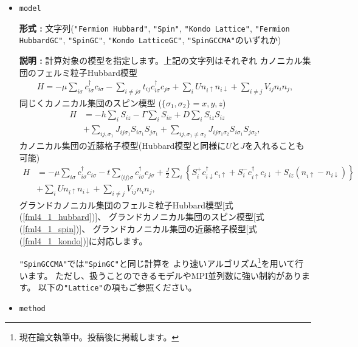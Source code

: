 \begin{itemize}

\item \verb|model|

{\bf 形式 :} 文字列(\verb|"Fermion Hubbard"|, \verb|"Spin"|, \verb|"Kondo Lattice"|, 
\verb|"Fermion HubbardGC"|, \verb|"SpinGC"|, \verb|"Kondo LatticeGC"|, 
\verb|"SpinGCCMA"|のいずれか)

{\bf 説明 :} 計算対象の模型を指定します。上記の文字列はそれぞれ
カノニカル集団のフェルミ粒子Hubbard模型
\begin{align}
H = - \mu \sum_{i \sigma} c^\dagger_{i \sigma} c_{i \sigma} 
- \sum_{i \neq j \sigma} t_{i j} c^\dagger_{i \sigma} c_{j \sigma} 
+ \sum_{i} U n_{i \uparrow} n_{i \downarrow}
+ \sum_{i \neq j} V_{i j} n_{i} n_{j},
\label{fml4_1_hubbard}
\end{align}
同じくカノニカル集団のスピン模型 ($\{\sigma_1, \sigma_2\}={x, y, z}$)
\begin{align}
H &= -h \sum_{i} S_{i z} - \Gamma \sum_{i} S_{i x} + D \sum_{i} S_{i z} S_{i z}
\nonumber \\
&+ \sum_{i j, \sigma_1}J_{i j \sigma_1} S_{i \sigma_1} S_{j \sigma_1}+ \sum_{i j, \sigma_1 \neq \sigma_2} J_{i j \sigma_1 \sigma_2} S_{i \sigma_1} S_{j \sigma_2} ,
\label{fml4_1_spin}
\end{align}
カノニカル集団の近藤格子模型(Hubbard模型と同様に$U$と$J$を入れることも可能)
\begin{align}
H &= - \mu \sum_{i \sigma} c^\dagger_{i \sigma} c_{i \sigma} 
- t \sum_{\langle i j \rangle \sigma} c^\dagger_{i \sigma} c_{j \sigma} 
+ \frac{J}{2} \sum_{i} \left\{
S_{i}^{+} c_{i \downarrow}^\dagger c_{i \uparrow}
+ S_{i}^{-} c_{i \uparrow}^\dagger c_{i \downarrow}
+ S_{i z} (n_{i \uparrow} - n_{i \downarrow})\right\}
\nonumber \\
& +  \sum_{i} U n_{i \uparrow} n_{i \downarrow}
+ \sum_{i \neq j} V_{i j} n_{i} n_{j}
,
\label{fml4_1_kondo}
\end{align}
グランドカノニカル集団のフェルミ粒子Hubbard模型[式(\ref{fml4_1_hubbard})]、
グランドカノニカル集団のスピン模型[式(\ref{fml4_1_spin})]、
グランドカノニカル集団の近藤格子模型[式(\ref{fml4_1_kondo})]に対応します。

\verb|"SpinGCCMA"|では\verb|"SpinGC"|と同じ計算を
より速いアルゴリズム\footnote{現在論文執筆中。投稿後に掲載します。}を用いて行います。
ただし、扱うことのできるモデルやMPI並列数に強い制約があります。
以下の\verb|"Lattice"|の項もご参照ください。

\item \verb|method|
  

\end{itemize}
